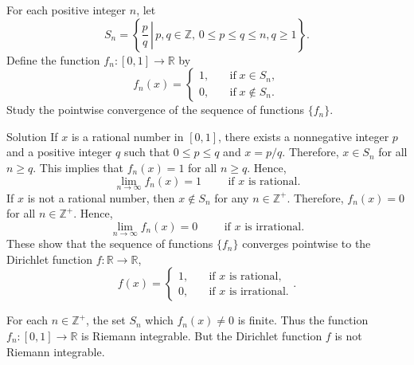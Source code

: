 \begin{example}[label=230303_5]{}
 For each positive integer $n$, let 
 \[S_n=\left\{\left.\frac{p}{q}\,\right|\, p, q\in\mathbb{Z},\,0\leq p\leq q\leq n, q\geq 1\right\}.\]
 Define the function $f_n:[0,1]\to\mathbb{R}$ by
 \[f_n(x)=\begin{cases} 1,\quad &\text{if}\; x\in S_n,\\0,\quad &\text{if}\; x\notin S_n.\end{cases}\]Study the pointwise convergence of the sequence of functions $\{f_n\}$.
\end{example}
\begin{solution}{Solution}
If $x$ is a rational number in $[0,1]$, there exists a nonnegative integer  $p$ and a positive integer $q$ such that $0\leq p\leq q$ and $x=p/q$. Therefore, $x\in S_n$ for all $n\geq q$. This implies that 
$f_n(x)=1$ for all $n\geq q$. Hence,
\[\lim_{n\to\infty}f_n(x)=1\hspace{1cm}\text{if $x$ is rational}.\]\bs 
If $x$ is not a rational number, then $x\notin S_n$ for any $n\in\mathbb{Z}^+$. Therefore, $f_n(x)=0$ for all $n\in\mathbb{Z}^+$. Hence,
\[\lim_{n\to\infty}f_n(x)=0\hspace{1cm}\text{if $x$ is irrational}.\]These show that the sequence of functions $\{f_n\}$ converges pointwise to the Dirichlet function $f:\mathbb{R}\to\mathbb{R}$,
\[f(x)=\begin{cases}1,\quad &\text{if $x$ is rational},\\
0,\quad & \text{if $x$ is irrational}.\end{cases}.\]
\end{solution}
\begin{highlight}{}
For each $n\in\mathbb{Z}^+$, the set $S_n$ which  $f_n(x)\neq 0$ is  finite. Thus the function $f_n:[0,1]\to\mathbb{R}$ is  Riemann integrable. But the Dirichlet function $f$ is not Riemann integrable.
\end{highlight}


